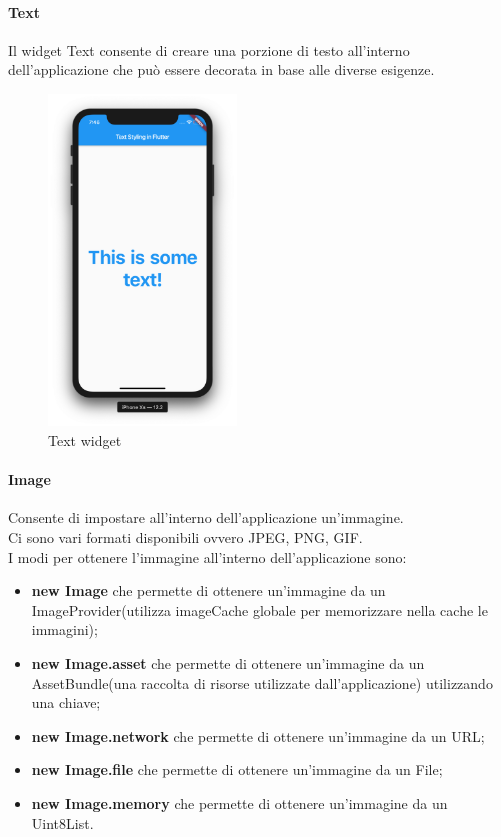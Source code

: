\paragraph{Text}
Il widget Text consente di creare una porzione di testo all'interno dell'applicazione che può essere decorata in base alle diverse esigenze.
\begin{figure}[htbp]	
	\centering
	\includegraphics[width=5cm]{immagini/text.png}
	\caption{Text widget}
	\label{fig:Text widget}
\end{figure}

\paragraph{Image}
Consente di impostare all'interno dell'applicazione un'immagine.\\
Ci sono vari formati disponibili ovvero JPEG, PNG, GIF.\\
I modi per ottenere l'immagine all'interno dell'applicazione sono:
\begin{itemize}
	\item \textbf{new Image} che permette di ottenere un'immagine da un  ImageProvider(utilizza imageCache globale per memorizzare nella cache le immagini);   
	\item \textbf{new Image.asset} che permette di ottenere un'immagine da un AssetBundle(una raccolta di risorse utilizzate dall'applicazione) utilizzando una chiave;
	\item \textbf{new Image.network} che permette di ottenere un'immagine da un URL;   
	\item \textbf{new Image.file} che permette di ottenere un'immagine da un File;
	\item \textbf{new Image.memory} che permette di ottenere un'immagine da un Uint8List.
\end{itemize}

